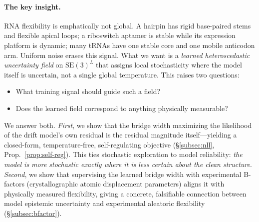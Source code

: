 \documentclass{article}
\theoremstyle{remark}
\theoremstyle{definition}
\newcommand{\SE}{\mathrm{SE}}
\begin{document}
\paragraph{The key insight.}
RNA flexibility is emphatically not global. A hairpin has rigid base-paired
stems and flexible apical loops; a riboswitch aptamer is stable while its
expression platform is dynamic; many tRNAs have one stable core and one mobile
anticodon arm. Uniform noise erases this signal. What we want is a
\emph{learned heteroscedastic uncertainty field} on $\SE(3)^L$ that assigns
local stochasticity where the model itself is uncertain, not a single global
temperature. This raises two questions:
\begin{itemize}[leftmargin=2em,itemsep=0pt,topsep=2pt]
\item[(i)] What training signal should guide such a field?
\item[(ii)] Does the learned field correspond to anything physically measurable?
\end{itemize}
We answer both. \emph{First}, we show that the bridge width maximizing the
likelihood of the drift model's own residual is the residual magnitude
itself---yielding a closed-form, temperature-free, self-regulating objective
(\S\ref{subsec:nll}, Prop.~\ref{prop:self-reg}). This ties stochastic
exploration to model reliability: \emph{the model is more stochastic exactly
where it is less certain about the clean structure}. \emph{Second}, we show
that supervising the learned bridge width with experimental B-factors
(crystallographic atomic displacement parameters) aligns it with physically
measured flexibility, giving a concrete, falsifiable connection between model
epistemic uncertainty and experimental aleatoric flexibility
(\S\ref{subsec:bfactor}).
\end{document}
